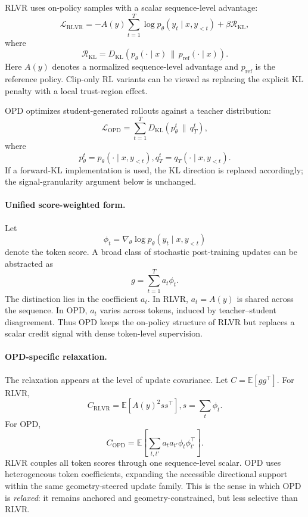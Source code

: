 \documentclass{llmxive}
\begin{document}
RLVR uses on-policy samples with a scalar sequence-level advantage:
\begin{equation}
\mathcal{L}_{\mathrm{RLVR}}
=
-
A(y)
\sum_{t=1}^{T}
\log p_\theta(y_t\mid x,y_{<t})
+
\beta \mathcal{R}_{\mathrm{KL}},
\end{equation}
where
\begin{equation}
\mathcal{R}_{\mathrm{KL}}
=
D_{\mathrm{KL}}
\!\left(
p_\theta(\cdot\mid x)
\,\|\,
p_{\mathrm{ref}}(\cdot\mid x)
\right).
\end{equation}
Here $A(y)$ denotes a normalized sequence-level advantage and
$p_{\mathrm{ref}}$ is the reference policy. Clip-only RL variants can be
viewed as replacing the explicit KL penalty with a local trust-region effect.

OPD optimizes student-generated rollouts against a teacher distribution:
\begin{equation}
\mathcal{L}_{\mathrm{OPD}}
=
\sum_{t=1}^{T}
D_{\mathrm{KL}}
\!\left(
p_\theta^t
\,\|\,
q_T^t
\right),
\end{equation}
where
\[
p_\theta^t
=
p_\theta(\cdot\mid x,y_{<t}),
q_T^t
=
q_T(\cdot\mid x,y_{<t}).
\]
If a forward-KL implementation is used, the KL direction is replaced
accordingly; the signal-granularity argument below is unchanged.

\paragraph{Unified score-weighted form.}
Let
\begin{equation}
\phi_t
=
\nabla_\theta
\log p_\theta(y_t\mid x,y_{<t})
\end{equation}
denote the token score. A broad class of stochastic post-training updates can
be abstracted as
\begin{equation}
g
=
\sum_{t=1}^{T}
a_t \phi_t .
\label{eq:app_unified_gradient}
\end{equation}
The distinction lies in the coefficient $a_t$. In RLVR, $a_t=A(y)$ is shared
across the sequence. In OPD, $a_t$ varies across tokens, induced by
teacher--student disagreement. Thus OPD keeps the on-policy structure of RLVR
but replaces a scalar credit signal with dense token-level supervision.

\paragraph{OPD-specific relaxation.}
The relaxation appears at the level of update covariance. Let
$C=\mathbb{E}[gg^\top]$. For RLVR,
\begin{equation}
C_{\mathrm{RLVR}}
=
\mathbb{E}
\left[
A(y)^2 ss^\top
\right],
s=\sum_t \phi_t .
\end{equation}
For OPD,
\begin{equation}
C_{\mathrm{OPD}}
=
\mathbb{E}
\left[
\sum_{t,t'}
a_t a_{t'}
\phi_t \phi_{t'}^\top
\right].
\end{equation}
RLVR couples all token scores through one sequence-level scalar. OPD uses
heterogeneous token coefficients, expanding the accessible directional support
within the same geometry-steered update family. This is the sense in which OPD
is \emph{relaxed}: it remains anchored and geometry-constrained, but less
selective than RLVR.
\end{document}
